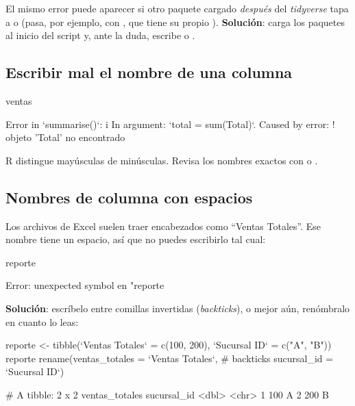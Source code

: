 El mismo error puede aparecer si otro paquete cargado \emph{después} del
\emph{tidyverse} tapa a  o  (pasa, por
ejemplo, con , que tiene su propio ).
\textbf{Solución}: carga los paquetes al inicio del script y, ante la duda,
escribe  o .

\subsection{Escribir mal el nombre de una columna}

\begin{rnoejecutar}
ventas %
\end{rnoejecutar}
\begin{rsalida}
Error in `summarise()`:
i In argument: `total = sum(Total)`.
Caused by error:
! objeto 'Total' no encontrado
\end{rsalida}

{\sloppy R distingue mayúsculas de minúsculas. Revisa los nombres exactos con
 o .\par}

\subsection{Nombres de columna con espacios}

Los archivos de Excel suelen traer encabezados como ``Ventas Totales''. Ese
nombre tiene un espacio, así que no puedes escribirlo tal cual:

\begin{rnoejecutar}
reporte %
\end{rnoejecutar}
\begin{rsalida}
Error: unexpected symbol en "reporte %
\end{rsalida}

\textbf{Solución}: escríbelo entre comillas invertidas (\emph{backticks}),
o mejor aún, renómbralo en cuanto lo leas:

\begin{rcode}
reporte <- tibble(`Ventas Totales` = c(100, 200),
                  `Sucursal ID` = c("A", "B"))
reporte %
  rename(ventas_totales = `Ventas Totales`,     # backticks
         sucursal_id    = `Sucursal ID`)
\end{rcode}
\begin{rsalida}
# A tibble: 2 x 2
  ventas_totales sucursal_id
           <dbl> <chr>      
1            100 A          
2            200 B          
\end{rsalida}

